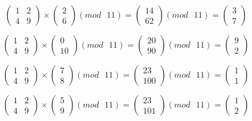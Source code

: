 \documentclass[a5paper, 10pt]{article}
\theoremstyle{definition}
\theoremstyle{plain}
\theoremstyle{remark}
\begin{document}
\begin{equation}
\begin{pmatrix}
1 & 2 \\
4 & 9
\end{pmatrix}
 \times
\begin{pmatrix}
 2\\
6
\end{pmatrix}
(mod \text{ }11)
= 
\begin{pmatrix}
 14\\
62
\end{pmatrix}
(mod \text{ }11)
= \begin{pmatrix}
 3\\
7
\end{pmatrix}
\end{equation}

\begin{equation}
\begin{pmatrix}
1 & 2 \\
4 & 9
\end{pmatrix}
 \times
\begin{pmatrix}
 0\\
10
\end{pmatrix}
(mod \text{ }11)
= 
\begin{pmatrix}
 20\\
90
\end{pmatrix}
(mod \text{ }11)
= \begin{pmatrix}
 9\\
2
\end{pmatrix}
\end{equation}

\begin{equation}
\begin{pmatrix}
1 & 2 \\
4 & 9
\end{pmatrix}
 \times
\begin{pmatrix}
 7\\
8
\end{pmatrix}
(mod \text{ }11)
= 
\begin{pmatrix}
 23\\
100
\end{pmatrix}
(mod \text{ }11)
= \begin{pmatrix}
 1\\
1
\end{pmatrix}
\end{equation}

\begin{equation}
\begin{pmatrix}
1 & 2 \\
4 & 9
\end{pmatrix}
 \times
\begin{pmatrix}
 5\\
9
\end{pmatrix}
(mod \text{ }11)
= 
\begin{pmatrix}
 23\\
101
\end{pmatrix}
(mod \text{ }11)
= \begin{pmatrix}
 1\\
2
\end{pmatrix}
\end{equation}
\end{document}
